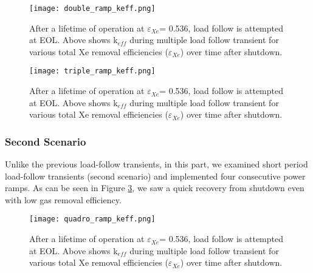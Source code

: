     \begin{figure}[htbp!]
        \begin{center}
            \texttt{[image: double\_ramp\_keff.png]}
        \end{center}
        \caption{After a lifetime of operation at $\varepsilon$$_{Xe}$= 0.536, load follow is attempted at EOL. Above shows k$_{eff}$ during multiple load follow transient for various total Xe removal efficiencies
        ($\varepsilon$$_{Xe}$) over time after shutdown.}
        \label{fig:double_keff}
    \end{figure}

    \begin{figure}[htbp!]
        \begin{center}
            \texttt{[image: triple\_ramp\_keff.png]}
        \end{center}
        \caption{After a lifetime of operation at $\varepsilon$$_{Xe}$= 0.536, load follow is attempted at EOL. Above shows  k$_{eff}$ during multiple load follow transient for various total Xe removal efficiencies
        ($\varepsilon$$_{Xe}$) over time after shutdown.}
        \label{fig:triple_keff}
    \end{figure}

\newpage
\FloatBarrier

\subsubsection{Second Scenario}

    Unlike the previous load-follow transients, in this part, we examined short period load-follow transients (second scenario) and implemented four consecutive power ramps. As can be seen in Figure \ref{fig:quadro_keff}, we saw a quick recovery from shutdown even with low gas removal efficiency.

    \begin{figure}[htbp!]
        \begin{center}
            \texttt{[image: quadro\_ramp\_keff.png]}
        \end{center}
        \caption{After a lifetime of operation at $\varepsilon$$_{Xe}$= 0.536, load follow is attempted at EOL. Above shows  k$_{eff}$ during multiple load follow transient for various total Xe removal efficiencies
        ($\varepsilon$$_{Xe}$) over time after shutdown.}
        \label{fig:quadro_keff}
    \end{figure}

